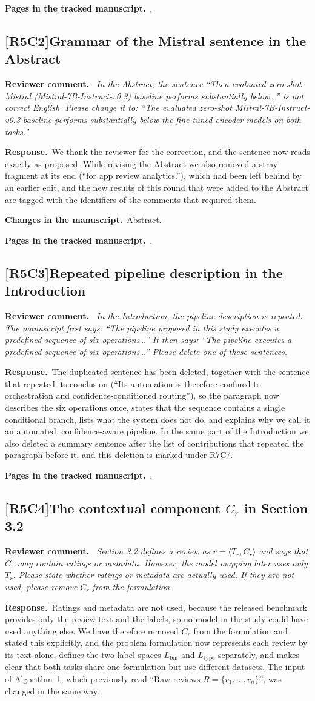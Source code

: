 \documentclass[11pt,a4paper]{article}
\newcommand{\comment}[3]{\subsection*{\textcolor{#1}{[#2]}\enspace #3}}
\newenvironment{reviewercomment}{\par\noindent\textbf{Reviewer comment.}\itshape\ }{\par}
\newcommand{\response}{\par\noindent\textbf{Response.}\ }
\newcommand{\changes}{\par\noindent\textbf{Changes in the manuscript.}\ }
\newcommand{\where}[1]{\par\noindent\textbf{Pages in the tracked manuscript.}\ \rvpages[M-]{#1}.}
\begin{document}
\where{R5C1}

\comment{rvFive}{R5C2}{Grammar of the Mistral sentence in the Abstract}
\begin{reviewercomment}
In the Abstract, the sentence ``Then evaluated zero-shot Mistral (Mistral-7B-Instruct-v0.3) baseline performs substantially below\ldots'' is not correct English. Please change it to: ``The evaluated zero-shot Mistral-7B-Instruct-v0.3 baseline performs substantially below the fine-tuned encoder models on both tasks.''
\end{reviewercomment}
\response We thank the reviewer for the correction, and the sentence now reads exactly as proposed. While revising the Abstract we also removed a stray fragment at its end (``for app review analytics.''), which had been left behind by an earlier edit, and the new results of this round that were added to the Abstract are tagged with the identifiers of the comments that required them.
\changes Abstract.
\where{R5C2}

\comment{rvFive}{R5C3}{Repeated pipeline description in the Introduction}
\begin{reviewercomment}
In the Introduction, the pipeline description is repeated. The manuscript first says: ``The pipeline proposed in this study executes a predefined sequence of six operations\ldots'' It then says: ``The pipeline executes a predefined sequence of six operations\ldots'' Please delete one of these sentences.
\end{reviewercomment}
\response The duplicated sentence has been deleted, together with the sentence that repeated its conclusion (``Its automation is therefore confined to orchestration and confidence-conditioned routing''), so the paragraph now describes the six operations once, states that the sequence contains a single conditional branch, lists what the system does not do, and explains why we call it an automated, confidence-aware pipeline. In the same part of the Introduction we also deleted a summary sentence after the list of contributions that repeated the paragraph before it, and this deletion is marked under R7C7.

\where{R5C3}

\comment{rvFive}{R5C4}{The contextual component $C_r$ in Section 3.2}
\begin{reviewercomment}
Section 3.2 defines a review as $r = \langle T_r, C_r\rangle$ and says that $C_r$ may contain ratings or metadata. However, the model mapping later uses only $T_r$. Please state whether ratings or metadata are actually used. If they are not used, please remove $C_r$ from the formulation.
\end{reviewercomment}
\response Ratings and metadata are not used, because the released benchmark provides only the review text and the labels, so no model in the study could have used anything else. We have therefore removed $C_r$ from the formulation and stated this explicitly, and the problem formulation now represents each review by its text alone, defines the two label spaces $L_{\mathrm{bin}}$ and $L_{\mathrm{type}}$ separately, and makes clear that both tasks share one formulation but use different datasets. The input of Algorithm~1, which previously read ``Raw reviews $R=\{r_1,\ldots,r_n\}$'', was changed in the same way.
\end{document}
